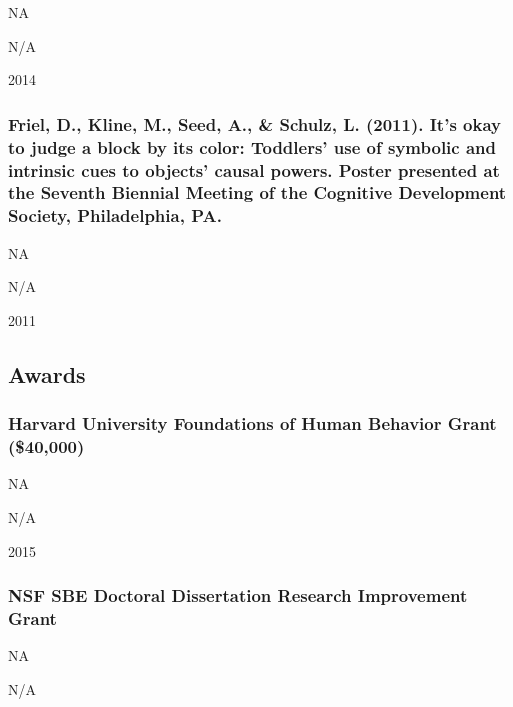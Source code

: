 \documentclass[
]{article}
\begin{document}
NA

N/A

2014

\hypertarget{friel-d.-kline-m.-seed-a.-schulz-l.-2011.-its-okay-to-judge-a-block-by-its-color-toddlers-use-of-symbolic-and-intrinsic-cues-to-objects-causal-powers.-poster-presented-at-the-seventh-biennial-meeting-of-the-cognitive-development-society-philadelphia-pa.}{%
\subsubsection{Friel, D., Kline, M., Seed, A., \& Schulz, L. (2011).
It's okay to judge a block by its color: Toddlers' use of symbolic and
intrinsic cues to objects' causal powers. Poster presented at the
Seventh Biennial Meeting of the Cognitive Development Society,
Philadelphia,
PA.}\label{friel-d.-kline-m.-seed-a.-schulz-l.-2011.-its-okay-to-judge-a-block-by-its-color-toddlers-use-of-symbolic-and-intrinsic-cues-to-objects-causal-powers.-poster-presented-at-the-seventh-biennial-meeting-of-the-cognitive-development-society-philadelphia-pa.}}

NA

N/A

2011

\hypertarget{awards}{%
\subsection{Awards}\label{awards}}

\hypertarget{harvard-university-foundations-of-human-behavior-grant-40000}{%
\subsubsection{Harvard University Foundations of Human Behavior Grant
(\$40,000)}\label{harvard-university-foundations-of-human-behavior-grant-40000}}

NA

N/A

2015

\hypertarget{nsf-sbe-doctoral-dissertation-research-improvement-grant}{%
\subsubsection{NSF SBE Doctoral Dissertation Research Improvement
Grant}\label{nsf-sbe-doctoral-dissertation-research-improvement-grant}}

NA

N/A
\end{document}
